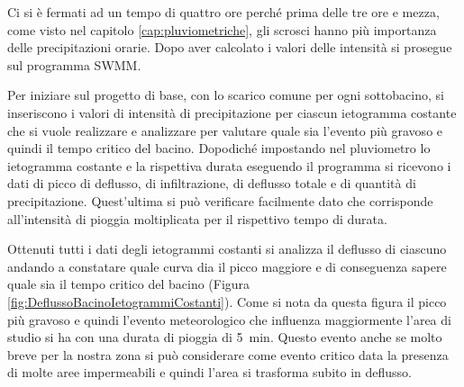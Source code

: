 Ci si è fermati ad un tempo di quattro ore perché prima delle tre ore e mezza, come visto nel capitolo \ref{cap:pluviometriche}, gli scrosci hanno più importanza delle precipitazioni orarie.
Dopo aver calcolato i valori delle intensità si prosegue sul programma SWMM.

Per iniziare sul progetto di base, con lo scarico comune per ogni sottobacino, si inseriscono i valori di intensità di precipitazione per ciascun ietogramma costante che si vuole realizzare e analizzare per valutare quale sia l'evento più gravoso e quindi il tempo critico del bacino. 
Dopodiché impostando nel pluviometro lo ietogramma costante e la rispettiva durata eseguendo il programma si ricevono i dati di picco di deflusso, di infiltrazione, di deflusso totale e di quantità di precipitazione.
Quest'ultima si può verificare facilmente dato che corrisponde all'intensità di pioggia moltiplicata per il rispettivo tempo di durata.

Ottenuti tutti i dati degli ietogrammi costanti si analizza il deflusso di ciascuno andando a constatare quale curva dia il picco maggiore e di conseguenza sapere quale sia il tempo critico del bacino (Figura \ref{fig:DeflussoBacinoIetogrammiCostanti}). 
Come si nota da questa figura il picco più gravoso e quindi l'evento meteorologico che influenza maggiormente l'area di studio si ha con una durata di pioggia di \SI{5}{\minute}.
Questo evento anche se molto breve per la nostra zona si può considerare come evento critico data la presenza di molte aree impermeabili e quindi l'area si trasforma subito in deflusso.


